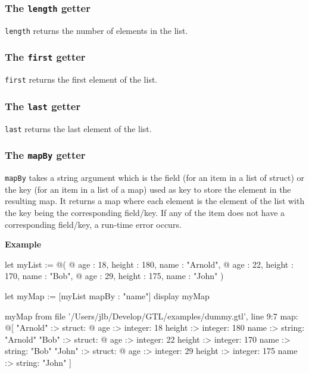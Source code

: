 \documentclass[10pt,openright,twosides,final]{memoir}
\newcommand{\gtlinline}[1]{\colorbox{light-blue}{\lstinline[language=gtl]{#1}}}
\newcommand{\example}{\vspace{.75em}\noindent\textbf{Example}\vspace{0em}}
\begin{document}
\subsubsection{The \texttt{length} getter}

\gtlinline{length} returns the number of elements in the list.

\subsubsection{The \texttt{first} getter}

\gtlinline{first} returns the first element of the list.

\subsubsection{The \texttt{last} getter}

\gtlinline{last} returns the last element of the list.

\subsubsection{The \texttt{mapBy} getter}
\label{sec:mapByGetterOnList}

\gtlinline{mapBy} takes a string argument which is the field (for an item in a list of struct) or the key (for an item in a list of a map) used as key to store the element in the resulting map. It returns a map where each element is the element of the list with the key being the corresponding field/key. If any of the item does not have a corresponding field/key, a run-time error occurs.

\example
\begin{gtl}
let myList := @(
  @{ age : 18, height : 180, name : "Arnold"},
  @{ age : 22, height : 170, name : "Bob"},
  @{ age : 29, height : 175, name : "John"}
)

let myMap := [myList mapBy : "name"]
display myMap
\end{gtl}
\begin{console}
myMap from file '/Users/jlb/Develop/GTL/examples/dummy.gtl', line 9:7
    map: @[
        "Arnold" :>
            struct: @{
                age :>
                    integer: 18
                height :>
                    integer: 180
                name :>
                    string: "Arnold"
            }
        "Bob" :>
            struct: @{
                age :>
                    integer: 22
                height :>
                    integer: 170
                name :>
                    string: "Bob"
            }
        "John" :>
            struct: @{
                age :>
                    integer: 29
                height :>
                    integer: 175
                name :>
                    string: "John"
            }
    ]
\end{console}
\end{document}
